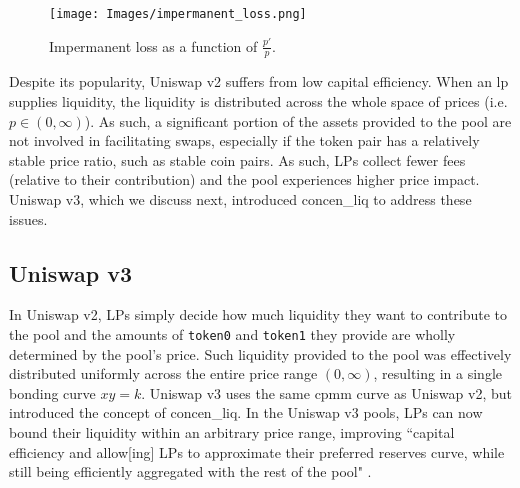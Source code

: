 \documentclass[11pt]{article}
\begin{document}
\begin{figure}[H]
    \centering
    \texttt{[image: Images/impermanent\_loss.png]}
    \caption{Impermanent loss as a function of $\frac{p'}{p}$.}
    \label{fig:impermanent_loss}
\end{figure}

Despite its popularity, Uniswap v2 suffers from low capital efficiency. When an \gls{lp} supplies liquidity, the liquidity is distributed across the whole space of prices (i.e. $p \in (0, \infty)$). As such, a significant portion of the assets provided to the pool are not involved in facilitating swaps, especially if the token pair has a relatively stable price ratio, such as stable coin pairs. As such, LPs collect fewer fees (relative to their contribution) and the pool experiences higher price impact. Uniswap v3, which we discuss next, introduced \gls{concen_liq} to address these issues.

\subsection{Uniswap v3}

In Uniswap v2, LPs simply decide how much liquidity they want to contribute to the pool and the amounts of \texttt{token0} and \texttt{token1} they provide are wholly determined by the pool's price. Such liquidity provided to the pool was effectively distributed uniformly across the entire price range $(0, \infty)$, resulting in a single bonding curve $xy=k$. Uniswap v3 uses the same \gls{cpmm} curve as Uniswap v2, but introduced the concept of  \gls{concen_liq}. In the Uniswap v3 pools, LPs can now bound their liquidity within an arbitrary price range, improving ``capital efficiency and allow[ing] LPs to approximate their preferred reserves curve, while still being efficiently aggregated with the rest of the pool" \citep{Uniswapv3}.
\end{document}
